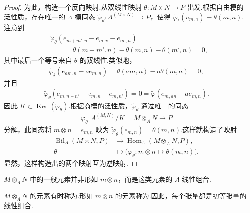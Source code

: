 \begin{proof}
为此，构造一个反向映射.从双线性映射 $\theta:M\times N\longrightarrow P$ 出发.根据自由模的泛性质，存在唯一的 $A$-模同态 $\widetilde\varphi_\theta:A^{(M\times N)}\longrightarrow P$，使得 $\widetilde\varphi_\theta(e_{m,n})=\theta(m,n)$.注意到
\begin{align*}
&\widetilde\varphi_\theta(e_{m+m',n}-e_{m,n}-e_{m',n})\\
&\qquad=\theta(m+m',n)-\theta(m,n)-\theta(m',n)=0,
\end{align*}
其中最后一个等号来自 $\theta$ 的双线性.类似地，
\begin{align*}
\widetilde\varphi_\theta(e_{am,n}-ae_{m,n})=\theta(am,n)-a\theta(m,n)=0,
\end{align*}
并且
\begin{align*}
\widetilde\varphi_\theta(e_{m,n+n'}-e_{m,n}-e_{m,n'})=0=\widetilde\varphi(e_{m,an}-ae_{m,n}).
\end{align*}
因此 $K\subset\operatorname{Ker}(\widetilde\varphi_\theta)$.根据商模的泛性质，$\widetilde\varphi_\theta$ 通过唯一的同态
\begin{align*}
\varphi_\theta:A^{(M,N)}/K=M\otimes_A N\longrightarrow P
\end{align*}
分解，此同态将 $m\otimes n=\overline{e_{m,n}}$ 映为 $\widetilde\varphi_\theta(e_{m,n})=\theta(m,n)$.这样就构造了映射
\begin{align*}
\operatorname{Bil}_A(M\times N,P)&\longrightarrow\operatorname{Hom}_A(M\otimes_A N,P),\\
\theta&\longmapsto\bigl(\varphi_\theta:m\otimes n\mapsto\theta(m,n)\bigr).
\end{align*}
显然，这样构造出的两个映射互为逆映射.
\end{proof}
\begin{remark*}[{注意}]
$M\otimes_A N$ 中的一般元素并非形如 $m\otimes n$，而是这类元素的 $A$-线性组合.
\end{remark*}
$M\otimes_A N$ 的元素有时称为.形如 $m\otimes n$ 的元素称为.因此，每个张量都是初等张量的线性组合.

